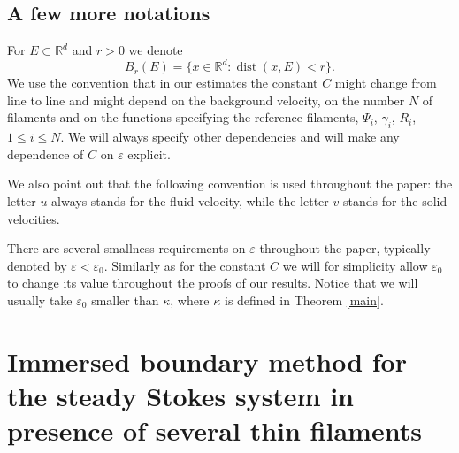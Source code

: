 \documentclass[JEP,XML,SOM,Unicode, NoEqCountersInSection,NoFloatCountersInSection,published]{cedram}
\newcommand{\R}{\mathbb{R}}
\let\eps\varepsilon
\DeclareMathOperator{\dist}{dist}
\theoremstyle{definition}
\theoremstyle{remark}
\begin{document}
\subsection{A few more notations}
For $E \subset \R^d$ and $r>0$ we denote
\begin{equation}
B_r(E) = \{ x \in \R^d : \dist(x,E) < r \}.
\end{equation}
We use the convention that in our estimates the constant $C$ might change from line to line and might depend on the background velocity, on the number $N$ of filaments and on the functions specifying the reference filaments, \ie $\Psi_i$, $\gamma_i$, $R_i$, $1 \leq i \leq N$.
We will always specify other dependencies and will make any dependence of $C$ on $\eps$ explicit.

We also point out that the following convention is used throughout the paper: the letter $u$ always stands for the fluid velocity, while the letter $v$ stands for the solid velocities.

There are several smallness requirements on $\eps$ throughout the paper, typically denoted by $\eps < \eps_0$. Similarly as for the constant $C$ we will for simplicity
allow $\eps_0$ to change its value throughout the proofs of our results. Notice that we will usually take $\eps_0$ smaller than $\kappa$, where $\kappa$ is defined in Theorem \ref{main}.

\section{Immersed boundary method for the steady Stokes system in presence of several thin filaments}
\label{sec:singularity.method}
\end{document}
